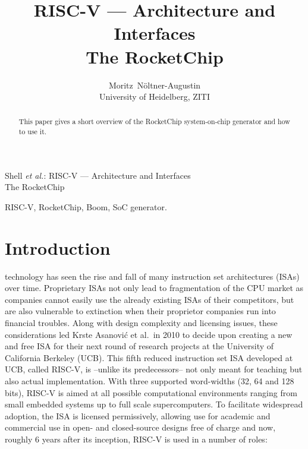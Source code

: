 \documentclass[journal,a4paper]{IEEEtran}
\def\krste/{Krste Asanovi\'c}
\begin{document}


\title{RISC-V --- Architecture and Interfaces\\The RocketChip}


\author{Moritz~N\"oltner-Augustin\\%
University of Heidelberg, ZITI}

%
{Shell \MakeLowercase{\textit{et al.}}: RISC-V --- Architecture and Interfaces\\The RocketChip}

\maketitle

\begin{abstract}
	This paper gives a short overview of the RocketChip system-on-chip generator and how to use it.
\end{abstract}

\begin{IEEEkeywords}
	RISC-V, RocketChip, Boom, SoC generator.
\end{IEEEkeywords}


\section{Introduction}
 technology has seen the rise and fall of many instruction set architectures (ISAs) over time.
Proprietary ISAs not only lead to fragmentation of the CPU market as companies cannot easily use the already existing ISAs of their competitors, but are also vulnerable to extinction when their proprietor companies run into financial troubles.
Along with design complexity and licensing issues, these considerations led \krste/ et al.\ in 2010 to decide upon creating a new and free ISA for their next round of research projects at the University of California Berkeley (UCB).
This fifth reduced instruction set ISA developed at UCB, called RISC-V, is --unlike its predecessors-- not only meant for teaching but also actual implementation.
With three supported word-widths (32, 64 and 128 bits\cite{riscv}), RISC-V is aimed at all possible computational environments ranging from small embedded systems up to full scale supercomputers.
To facilitate widespread adoption, the ISA is licensed permissively, allowing use for academic and commercial use in open- and closed-source designs free of charge and now, roughly 6 years after its inception, RISC-V is used in a number of roles:
\end{document}
